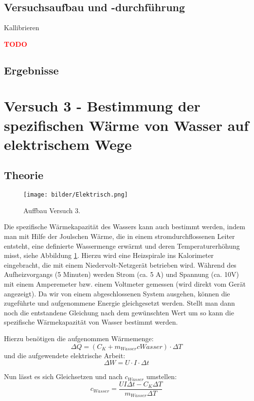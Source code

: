    \subsection{Versuchsaufbau und -durchführung}
     Kallibrieren

		\textbf{\textcolor{red}{TODO}}
    \subsection{Ergebnisse}
      

\section{Versuch 3 - Bestimmung der spezifischen Wärme von Wasser auf elektrischem Wege}
    \subsection{Theorie}
    
        	\begin{figure}[ht]
    	\label{fig:abb3}
    	\begin{center}
    		\texttt{[image: bilder/Elektrisch.png]}
    		\caption{Auffbau Versuch 3.}
    	\end{center}
    \end{figure}
    Die spezifische Wärmekapazität des Wassers kann auch bestimmt werden, indem man mit Hilfe der
    Joulschen Wärme, die in einem stromdurchflossenen Leiter entsteht, eine definierte Wassermenge
    erwärmt und deren Temperaturerhöhung misst, siehe Abbildung \ref{fig:abb3}. Hierzu wird eine Heizspirale ins Kalorimeter
    eingebracht, die mit einem Niedervolt-Netzgerät betrieben wird. Während des Aufheizvorgangs (5
    Minuten) werden Strom (ca. 5 A) und Spannung (ca. 10V) mit einem Amperemeter bzw. einem
    Voltmeter gemessen (wird direkt vom Gerät angezeigt). 
   Da wir von einem abgeschlossenen System ausgehen, können die zugeführte und aufgenommene
   Energie gleichgesetzt werden. Stellt man dann noch die entstandene Gleichung nach dem
   gewünschten Wert um so kann die spezifische Wärmekapazität von Wasser bestimmt werden.
   
   \noindent Hierzu benötigen die aufgenommen Wärmemenge:
   $$\Delta Q = (C_{K} + m_{Wasser}c{Wasser} ) \cdot \Delta T$$
   und die aufgewendete elektrische Arbeit:
   $$\Delta W =  U \cdot I \cdot \Delta t$$
   
   Nun lässt es sich Gleichsetzen und nach $c_{Wasser}$ umstellen:
   $$c_{Wasser} = \frac{UI\Delta t - C_{K}\Delta T}{m_{Wasser} \Delta T}$$
